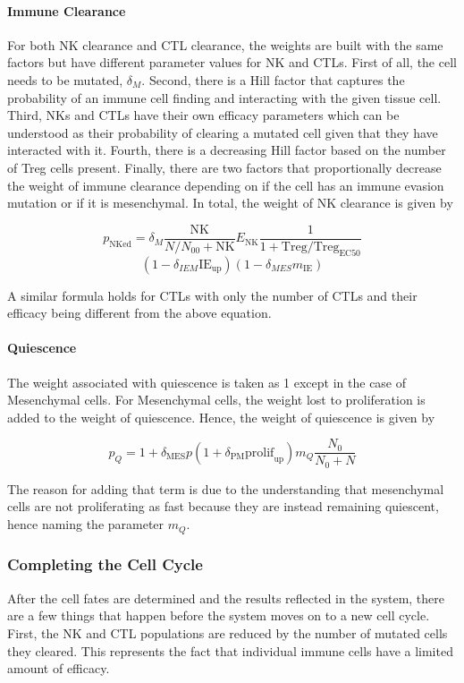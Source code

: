 \documentclass{article}
\begin{document}
\paragraph{Immune Clearance}
For both NK clearance and CTL clearance, the weights are built with the same factors but have different parameter values for NK and CTLs.
First of all, the cell needs to be mutated, $\delta_M$.
Second, there is a Hill factor that captures the probability of an immune cell finding and interacting with the given tissue cell.
Third, NKs and CTLs have their own efficacy parameters which can be understood as their probability of clearing a mutated cell given that they have interacted with it.
Fourth, there is a decreasing Hill factor based on the number of Treg cells present.
Finally, there are two factors that proportionally decrease the weight of immune clearance depending on if the cell has an immune evasion mutation or if it is mesenchymal.
In total, the weight of NK clearance is given by

$$ p_{\text{NKed}} =  \delta_M \frac{\text{NK}}{N/N_{00}+\text{NK}} E_{\text{NK}} \frac{1}{1+\text{Treg}/\text{Treg}_{\text{EC50}}} $$ $$ (1-\delta_{IEM}\text{IE}_{\text{up}})(1-\delta_{MES}m_{\text{IE}})$$

A similar formula holds for CTLs with only the number of CTLs and their efficacy being different from the above equation.


\paragraph{Quiescence}
The weight associated with quiescence is taken as 1 except in the case of Mesenchymal cells.
For Mesenchymal cells, the weight lost to proliferation is added to the weight of quiescence.
Hence, the weight of quiescence is given by

$$ p_Q = 1 + \delta_{\text{MES}}p(1+\delta_{\text{PM}}\text{prolif}_{\text{up}})m_Q\frac{N_0}{N_0+N} $$

The reason for adding that term is due to the understanding that mesenchymal cells are not proliferating as fast because they are instead remaining quiescent, hence naming the parameter $m_Q$.

\subsubsection{Completing the Cell Cycle}
After the cell fates are determined and the results reflected in the system, there are a few things that happen before the system moves on to a new cell cycle.
First, the NK and CTL populations are reduced by the number of mutated cells they cleared.
This represents the fact that individual immune cells have a limited amount of efficacy.
\end{document}
